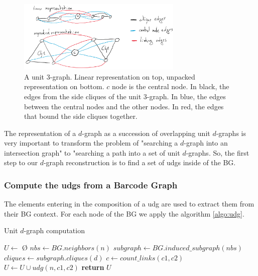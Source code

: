 \documentclass{article}
\begin{document}
\begin{figure}[htp]
    \centering
    \includegraphics[width=0.7\textwidth]{udg_composition.pdf}
    \caption{A unit 3-graph. Linear representation on top, unpacked representation on bottom. $c$ node is the central node. In black, the edges from the side cliques of the unit 3-graph. In blue, the edges between the central nodes and the other nodes. In red, the edges that bound the side cliques together.}
    \label{fig:perfect_udg}
\end{figure}

The representation of a $d$-graph as a succession of overlapping unit $d$-graphs is very important to transform the problem of "searching a $d$-graph into an intersection graph" to "searching a path into a set of unit $d$-graphs.
So, the first step to our $d$-graph reconstruction is to find a set of udgs inside of the BG.

\subsubsection*{Compute the udgs from a Barcode Graph}

The elements entering in the composition of a udg are used to extract them from their BG context.
For each node of the BG we apply the algorithm \ref{algo:udg}.

\begin{algorithm}
    \caption{Unit $d$-graph computation}
    \label{algo:udg}
    \begin{algorithmic}[1] %
         
            \State $U \gets$ \O
            \State $nbs\gets BG.neighbors(n)$
            \State $subgraph \gets BG.induced\_subgraph(nbs)$
            \State $cliques \gets subgraph.cliques(d)$ 
                    \State $c \gets count\_links(c1, c2)$ 
                        \State $U \gets U \cup udg(n, c1, c2)$ 
                    \EndIf
                \EndFor
            \EndFor
            \State \textbf{return} $U$
        \EndProcedure
    \end{algorithmic}
\end{algorithm}
\end{document}
